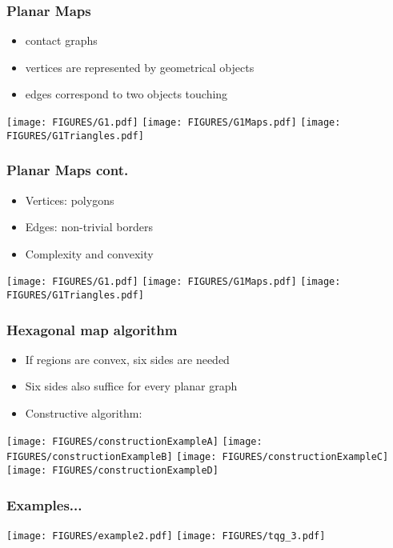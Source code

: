 \documentclass{beamer}
\begin{document}
\begin{frame}[plain]
\frametitle{Planar Maps}

\begin{itemize}
\item contact graphs
\item vertices are represented by geometrical objects
\item edges correspond to two objects touching
\end{itemize}

\begin{center}
    \texttt{[image: FIGURES/G1.pdf]}
    \texttt{[image: FIGURES/G1Maps.pdf]}
    \texttt{[image: FIGURES/G1Triangles.pdf]}
 \end{center}
\end{frame}

\begin{frame}[plain]
\frametitle{Planar Maps cont.}
\begin{itemize}
\item Vertices: polygons
\item Edges: non-trivial borders
\item Complexity and convexity
\end{itemize}

\begin{center}
    \texttt{[image: FIGURES/G1.pdf]}
    \texttt{[image: FIGURES/G1Maps.pdf]}
    \texttt{[image: FIGURES/G1Triangles.pdf]}
 \end{center}
\end{frame}

\begin{frame}[plain]
\frametitle{Hexagonal map algorithm}
\begin{itemize}
\item If regions are convex, six sides are needed
\item Six sides also suffice for every planar graph
\item Constructive algorithm:
\end{itemize}
\begin{center}
\texttt{[image: FIGURES/constructionExampleA]}
\texttt{[image: FIGURES/constructionExampleB]}
\texttt{[image: FIGURES/constructionExampleC]}
\texttt{[image: FIGURES/constructionExampleD]}
 \end{center}
\end{frame}



\begin{frame}[plain]
\frametitle{Examples...}
\begin{center}
\texttt{[image: FIGURES/example2.pdf]}
\texttt{[image: FIGURES/tqg\_3.pdf]}
 \end{center}
\end{frame}
\end{document}
